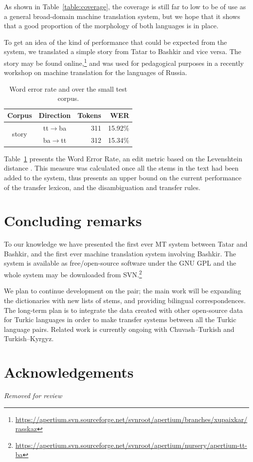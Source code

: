 \documentclass[11pt,a4paper]{article}
\begin{document}
As shown in Table~\ref{table:coverage}, the coverage is still far to low to be of use as a 
general broad-domain machine translation
system, but we hope that it shows that a good proportion of the morphology of both languages
is in place.

To get an idea of the kind of performance that could be expected from the system, we 
translated a simple story from Tatar to Bashkir and vice versa. The story may be found 
online,\footnote{\url{https://apertium.svn.sourceforge.net/svnroot/apertium/branches/xupaixkar/rasskaz}}
and was used for pedagogical purposes in a recently workshop on machine translation
for the languages of Russia.

\begin{table}
  \begin{center}
  \begin{tabular}{c|c|r|r}
   Corpus                 & Direction         & Tokens  & WER  \\
  \hline
   \multirow{2}{*}{story} & tt$\rightarrow$ba & 311     & 15.92\% \\
                          & ba$\rightarrow$tt & 312     & 15.34\%  \\
  \hline
  \end{tabular}
    \caption{Word error rate and over the small test corpus.}
    \label{table:wer}
  \end{center}
\end{table}


Table~\ref{table:wer} presents the Word Error Rate, an edit metric based on the Levenshtein 
distance \cite{levenshtein/1966}. This measure was calculated once all the stems in the 
text had been added to the system, thus presents an upper bound on the current performance
of the transfer lexicon, and the disambiguation and transfer rules.

\section{Concluding remarks}
\label{sec:conc}

To our knowledge we have presented the first ever MT system between Tatar and Bashkir, and the first ever machine translation system involving Bashkir. The system is available as free/open-source software under the GNU GPL and the 
whole system may be downloaded from SVN.\footnote{\url{https://apertium.svn.sourceforge.net/svnroot/apertium/nursery/apertium-tt-ba}}

We plan to continue development on the pair; the main work will be expanding the dictionaries with new lists of stems, and providing bilingual correspondences. The long-term plan is to integrate the data created with other open-source data for Turkic languages in order to make transfer systems between all the Turkic language pairs.  Related work is currently ongoing with Chuvash--Turkish and Turkish--Kyrgyz.

\section*{Acknowledgements}

{\em Removed for review}



\end{document}
